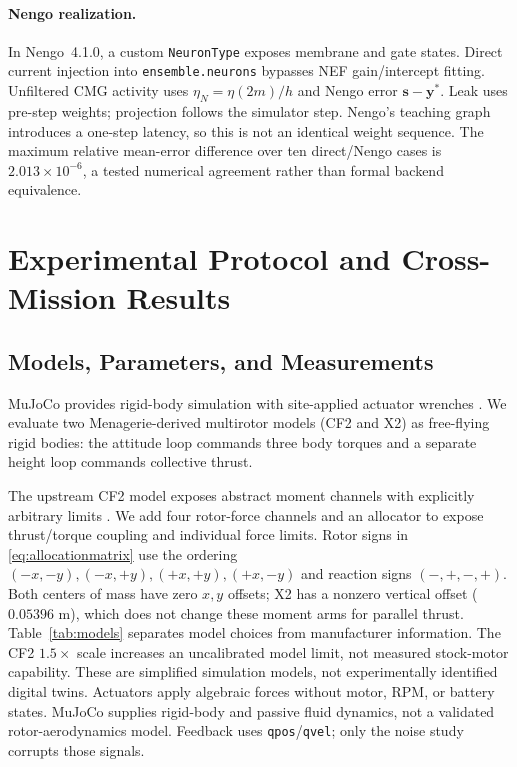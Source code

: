 \documentclass[letterpaper, 10 pt, conference]{ieeeconf}
\begin{document}
\paragraph{Nengo realization.}
In Nengo~4.1.0, a custom \texttt{NeuronType} exposes membrane and gate states. Direct current injection into \texttt{ensemble.neurons} bypasses NEF gain/intercept fitting. Unfiltered CMG activity uses $\eta_N=\eta(2m)/h$ and Nengo error $\bm s-\bm y^*$. Leak uses pre-step weights; projection follows the simulator step. Nengo's teaching graph introduces a one-step latency, so this is not an identical weight sequence. The maximum relative mean-error difference over ten direct/Nengo cases is $2.013\times10^{-6}$, a tested numerical agreement rather than formal backend equivalence.

\section{Experimental Protocol and Cross-Mission Results}
\label{sec:results}
\subsection{Models, Parameters, and Measurements}
MuJoCo provides rigid-body simulation with site-applied actuator wrenches \cite{todorov2012mujoco}. We evaluate two Menagerie-derived multirotor models \cite{menagerieModels} (CF2 and X2) as free-flying rigid bodies: the attitude loop commands three body torques and a separate height loop commands collective thrust.

The upstream CF2 model exposes abstract moment channels with explicitly arbitrary limits \cite{menagerieCF2}. We add four rotor-force channels and an allocator to expose thrust/torque coupling and individual force limits. Rotor signs in \eqref{eq:allocationmatrix} use the ordering
$(-x,-y),(-x,+y),(+x,+y),(+x,-y)$ and reaction signs $(-,+,-,+)$.
Both centers of mass have zero $x,y$ offsets; X2 has a nonzero vertical
offset ($0.05396$ m), which does not change these moment arms for parallel thrust.
Table~\ref{tab:models} separates model choices from manufacturer information.
The CF2 $1.5\times$ scale increases an uncalibrated model limit, not measured
stock-motor capability. These are simplified simulation models, not
experimentally identified digital twins. Actuators apply algebraic forces
without motor, RPM, or battery states. MuJoCo supplies rigid-body and
passive fluid dynamics, not a validated rotor-aerodynamics model. Feedback
uses \texttt{qpos}/\texttt{qvel}; only the noise study corrupts those signals.
\end{document}
